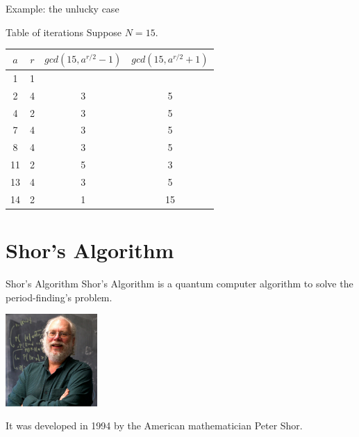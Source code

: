 \documentclass{beamer}
\begin{document}
    \begin{frame}{Example: the unlucky case}
        \begin{exampleblock}{Table of iterations}
            Suppose $N = 15$.
            \begin{center}
                \begin{tabular}{ |c|c|c|c| } 
                    \hline
                    $a$ & $r$ & $gcd(15, a^{r/2} - 1)$ & $gcd(15, a^{r/2} + 1)$ \\ 
                    \hline
                    1 & 1 & & \\ 
                    \hline
                    2 & 4 & 3 & 5 \\ 
                    \hline
                    4 & 2 & 3 & 5 \\
                    \hline
                    7 & 4 & 3 & 5 \\
                    \hline
                    8 & 4 & 3 & 5 \\
                    \hline
                    11 & 2 & 5 & 3 \\
                    \hline
                    13 & 4 & 3 & 5 \\
                    \hline
                    \rowcolor{orangered} 14 & 2 & 1 & 15 \\
                    \hline
                \end{tabular}
            \end{center}
        \end{exampleblock}
    \end{frame}

    \section{Shor's Algorithm}
    \begin{frame}{Shor's Algorithm}
        Shor's Algorithm is a quantum computer algorithm to solve the period-finding's problem.

        \begin{center}
            \includegraphics[height=3.5cm,keepaspectratio]{images/peter-shor.jpg}
        \end{center}
        
        It was developed in 1994 by the American mathematician Peter Shor.
    \end{frame}
\end{document}
